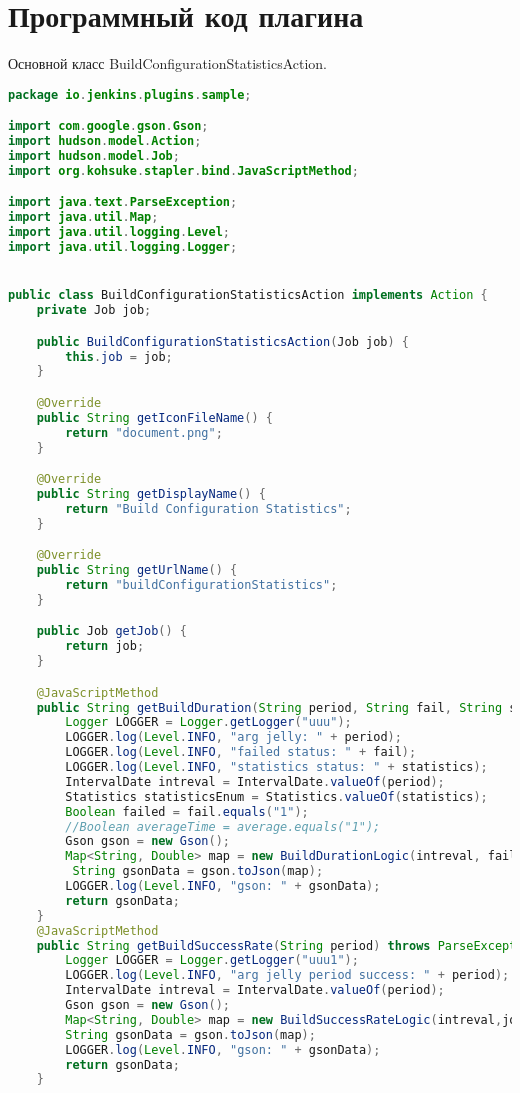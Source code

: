 \chapter{Программный код плагина}\label{appendix-extra-examples}

Основной класс BuildConfigurationStatisticsAction.

\begin{lstlisting}[language=Java]
package io.jenkins.plugins.sample;

import com.google.gson.Gson;
import hudson.model.Action;
import hudson.model.Job;
import org.kohsuke.stapler.bind.JavaScriptMethod;

import java.text.ParseException;
import java.util.Map;
import java.util.logging.Level;
import java.util.logging.Logger;


public class BuildConfigurationStatisticsAction implements Action {
    private Job job;

    public BuildConfigurationStatisticsAction(Job job) {
        this.job = job;
    }

    @Override
    public String getIconFileName() {
        return "document.png";
    }

    @Override
    public String getDisplayName() {
        return "Build Configuration Statistics";
    }

    @Override
    public String getUrlName() {
        return "buildConfigurationStatistics";
    }

    public Job getJob() {
        return job;
    }

    @JavaScriptMethod
    public String getBuildDuration(String period, String fail, String statistics) throws ParseException {
        Logger LOGGER = Logger.getLogger("uuu");
        LOGGER.log(Level.INFO, "arg jelly: " + period);
        LOGGER.log(Level.INFO, "failed status: " + fail);
        LOGGER.log(Level.INFO, "statistics status: " + statistics);
        IntervalDate intreval = IntervalDate.valueOf(period);
        Statistics statisticsEnum = Statistics.valueOf(statistics);
        Boolean failed = fail.equals("1");
        //Boolean averageTime = average.equals("1");
        Gson gson = new Gson();
        Map<String, Double> map = new BuildDurationLogic(intreval, failed,job.getBuilds()).getBuildsDuration(statisticsEnum);
         String gsonData = gson.toJson(map);
        LOGGER.log(Level.INFO, "gson: " + gsonData);
        return gsonData;
    }
    @JavaScriptMethod
    public String getBuildSuccessRate(String period) throws ParseException {
        Logger LOGGER = Logger.getLogger("uuu1");
        LOGGER.log(Level.INFO, "arg jelly period success: " + period);
        IntervalDate intreval = IntervalDate.valueOf(period);
        Gson gson = new Gson();
        Map<String, Double> map = new BuildSuccessRateLogic(intreval,job.getBuilds()).getSuccessRate();
        String gsonData = gson.toJson(map);
        LOGGER.log(Level.INFO, "gson: " + gsonData);
        return gsonData;
    }


\end{lstlisting}
